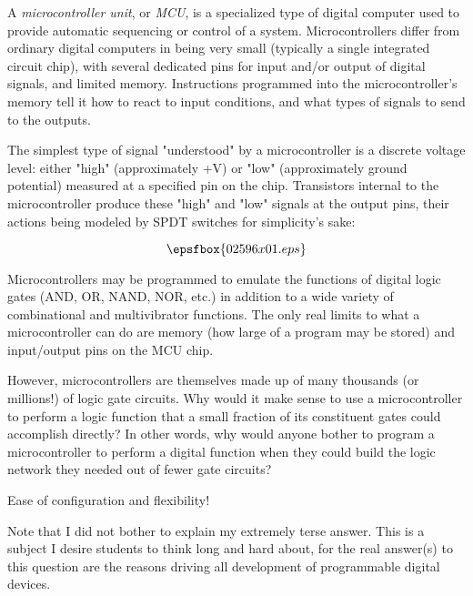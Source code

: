 

A {\it microcontroller unit}, or {\it MCU}, is a specialized type of digital computer used to provide automatic sequencing or control of a system.  Microcontrollers differ from ordinary digital computers in being very small (typically a single integrated circuit chip), with several dedicated pins for input and/or output of digital signals, and limited memory.  Instructions programmed into the microcontroller's memory tell it how to react to input conditions, and what types of signals to send to the outputs.

The simplest type of signal "understood" by a microcontroller is a discrete voltage level: either "high" (approximately +V) or "low" (approximately ground potential) measured at a specified pin on the chip.  Transistors internal to the microcontroller produce these "high" and "low" signals at the output pins, their actions being modeled by SPDT switches for simplicity's sake:

$$\epsfbox{02596x01.eps}$$

Microcontrollers may be programmed to emulate the functions of digital logic gates (AND, OR, NAND, NOR, etc.) in addition to a wide variety of combinational and multivibrator functions.  The only real limits to what a microcontroller can do are memory (how large of a program may be stored) and input/output pins on the MCU chip.

However, microcontrollers are themselves made up of many thousands (or millions!) of logic gate circuits.  Why would it make sense to use a microcontroller to perform a logic function that a small fraction of its constituent gates could accomplish directly?  In other words, why would anyone bother to program a microcontroller to perform a digital function when they could build the logic network they needed out of fewer gate circuits?







Ease of configuration and flexibility!







Note that I did not bother to explain my extremely terse answer.  This is a subject I desire students to think long and hard about, for the real answer(s) to this question are the reasons driving all development of programmable digital devices.




